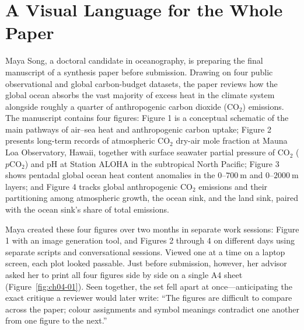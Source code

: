 \chapter{A Visual Language for the Whole Paper}

Maya Song, a doctoral candidate in oceanography, is preparing the final manuscript of a synthesis paper before submission. Drawing on four public observational and global carbon-budget datasets, the paper reviews how the global ocean absorbs the vast majority of excess heat in the climate system alongside roughly a quarter of anthropogenic carbon dioxide ($\text{CO}_2$) emissions. The manuscript contains four figures: Figure 1 is a conceptual schematic of the main pathways of air--sea heat and anthropogenic carbon uptake; Figure 2 presents long-term records of atmospheric $\text{CO}_2$ dry-air mole fraction at Mauna Loa Observatory, Hawaii, together with surface seawater partial pressure of $\text{CO}_2$ ($p\text{CO}_2$) and pH at Station ALOHA in the subtropical North Pacific; Figure 3 shows pentadal global ocean heat content anomalies in the $0\text{--}700\ \text{m}$ and $0\text{--}2000\ \text{m}$ layers; and Figure 4 tracks global anthropogenic $\text{CO}_2$ emissions and their partitioning among atmospheric growth, the ocean sink, and the land sink, paired with the ocean sink's share of total emissions.

Maya created these four figures over two months in separate work sessions: Figure 1 with an image generation tool, and Figures 2 through 4 on different days using separate scripts and conversational sessions. Viewed one at a time on a laptop screen, each plot looked passable. Just before submission, however, her advisor asked her to print all four figures side by side on a single A4 sheet (Figure~\ref{fig:ch04-01}). Seen together, the set fell apart at once---anticipating the exact critique a reviewer would later write: ``The figures are difficult to compare across the paper; colour assignments and symbol meanings contradict one another from one figure to the next.''

